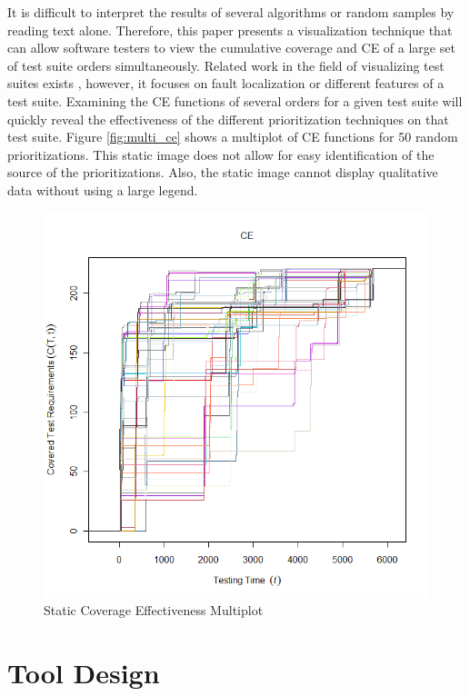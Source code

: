 \documentclass{vgtc}                          %
\begin{document}
It is difficult to interpret the results of several algorithms or random samples by reading text alone.  Therefore, this paper presents a visualization technique that can allow software testers to view the cumulative coverage and CE of a large set of test suite orders simultaneously.   Related work in the field of visualizing test suites exists \cite{tarantula}, however, it focuses on fault localization or different features of a test suite.  Examining the CE functions of several orders for a given test suite will quickly reveal the effectiveness of the different prioritization techniques on that test suite.  Figure \ref{fig:multi_ce} shows a multiplot of CE functions for 50 random prioritizations.  This static image does not allow for easy identification of the source of the prioritizations.  Also, the static image cannot display qualitative data without using a large legend.  

\begin{figure}[t]
\centering
\includegraphics[scale=.25]{original.png}
\vspace{-.2in}
\caption{Static Coverage Effectiveness Multiplot}
\vspace{-.2in}
\end{figure}
\label{fig:multi_ce}

\vspace{-.05in}
\section{Tool Design}
\end{document}
